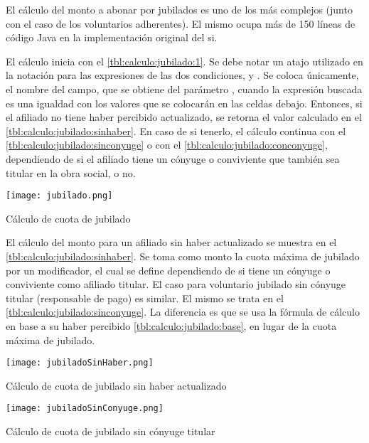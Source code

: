 El cálculo del monto a abonar por jubilados es uno de los más complejos (junto con el caso de los voluntarios adherentes).
El mismo ocupa más de 150 líneas de código Java en la implementación original del \acrshort{si}.

El cálculo inicia con el \cref{tbl:calculo:jubilado:1}.
Se debe notar un atajo utilizado en la notación para las expresiones de las dos condiciones,  y .
Se coloca únicamente, el nombre del campo, que se obtiene del parámetro , cuando la expresión buscada es una igualdad con los valores que se colocarán en las celdas debajo.
Entonces, si el afiliado no tiene haber percibido actualizado, se retorna el valor calculado en el \cref{tbl:calculo:jubilado:sinhaber}. 
En caso de si tenerlo, 
el cálculo continua con el \cref{tbl:calculo:jubilado:sinconyuge} o con el \cref{tbl:calculo:jubilado:conconyuge}, dependiendo de si el afiliado tiene un cónyuge o conviviente que también sea titular en la obra social, o no.

\begin{table*}
    \centering
    \texttt{[image: jubilado.png]}
    \caption{Cálculo de cuota de jubilado}
    \label{tbl:calculo:jubilado:1}
\end{table*}

El cálculo del monto para un afiliado sin haber actualizado se muestra en el \cref{tbl:calculo:jubilado:sinhaber}.
Se toma como monto la cuota máxima de jubilado por un modificador, el cual se define dependiendo de si tiene un cónyuge o conviviente como afiliado titular.
El caso para voluntario jubilado sin cónyuge titular (responsable de pago) es similar.
El mismo se trata en el \cref{tbl:calculo:jubilado:sinconyuge}.
La diferencia es que se usa la fórmula de cálculo en base a su haber percibido \cref{tbl:calculo:jubilado:base}, en lugar de la cuota máxima de jubilado.

\begin{table*}
    \centering
    \texttt{[image: jubiladoSinHaber.png]}
    \caption{Cálculo de cuota de jubilado sin haber actualizado}
    \label{tbl:calculo:jubilado:sinhaber}
\end{table*}


\begin{table*}
    \centering
    \texttt{[image: jubiladoSinConyuge.png]}
    \caption{Cálculo de cuota de jubilado sin cónyuge titular}
    \label{tbl:calculo:jubilado:sinconyuge}
\end{table*}

